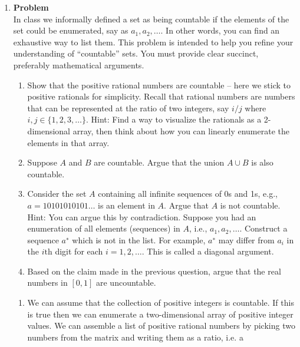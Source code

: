 \documentclass[12pt]{article}
\newenvironment{Ex}{\textbf{Problem}\vspace{.75em}\\}{}
\begin{document}
\begin{enumerate}
\begin{Ex}
\begin{solution}
\begin{enumerate}
      \end{enumerate}
    \end{solution}
  \end{Ex}
\item 
  \begin{Ex}
    In class we informally defined a set as being countable if the
    elements of the set could be enumerated, say as
    $a_1,a_2,\ldots$. In other words, you can find an exhaustive way
    to list them. This problem is intended to help you refine your
    understanding of ``countable'' sets. You must provide clear
    succinct, preferably mathematical arguments.
    \begin{enumerate}
    \item Show that the positive rational numbers are countable --
      here we stick to positive rationals for simplicity. Recall that
      rational numbers are numbers that can be represented at the
      ratio of two integers, say $i/j$ where $i, j \in \{1, 2, 3,
      \ldots\}$. Hint: Find a way to visualize the rationals as a
      2-dimensional array, then think about how you can linearly
      enumerate the elements in that array.
    \item Suppose $A$ and $B$ are countable. Argue that the union $A
      \cup B$ is also countable.
    \item Consider the set $A$ containing all infinite sequences of 0s
      and 1s, e.g., $a = 10101010101\ldots$ is an element in
      $A$. Argue that $A$ is not countable. Hint: You can argue this
      by contradiction. Suppose you had an enumeration of all elements
      (sequences) in $A$, i.e., $a_1, a_2,\ldots$. Construct a
      sequence $a^∗$ which is not in the list. For example, $a^∗$ may
      differ from $a_i$ in the $i\text{th}$ digit for each $i = 1, 2,
      \ldots$. This is called a diagonal argument.
    \item Based on the claim made in the previous question, argue that
      the real numbers in $[0, 1]$ are uncountable.
    \end{enumerate}
    \begin{solution} \hfill
      \begin{enumerate}
      \item We can assume that the collection of positive integers is
        countable. If this is true then we can enumerate a
        two-dimensional array of positive integer values. We can
        assemble a list of positive rational numbers by picking two
        numbers from the matrix and writing them as a ratio, i.e. a

\end{enumerate}
\end{solution}
\end{Ex}
\end{enumerate}
\end{document}
